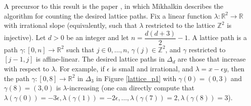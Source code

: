 \documentclass{amsart}
\begin{document}
A precursor to this result is the paper \cite{MikCountingCurvesLatticePaths}, in which Mikhalkin describes the algorithm for counting the desired lattice paths. Fix a linear function $\lambda: \mathbb{R}^2\rightarrow \mathbb{R}$ with irrational slope (equivalently, such that $\lambda$ restricted to the lattice $\mathbb{Z}^2$ is injective). Let $d>0$ be an integer and let $n=\dfrac{d(d+3)}{2}-1$. A lattice path is a path $\gamma: [0,n]\rightarrow \mathbb{R}^2$ such that $j\in 0,\dots, n$, $\gamma(j)\in \mathbb{Z}^2$, and $\gamma$ restricted to $[j-1,j]$ is affine-linear. The desired lattice paths in $\Delta_d$ are those that increase with respect to $\lambda$. For example, if $\epsilon$ is small and irrational, and $\lambda=x-\epsilon y$, then the path $\gamma: [0,8]\rightarrow \mathbb{R}^2$ in $\Delta_3$ in Figure \ref{lattice_p1} with $\gamma(0)=(0,3)$ and $\gamma(8)=(3,0)$ is $\lambda$-increasing (one can directly compute that $\lambda(\gamma(0))=-3\epsilon, \lambda(\gamma(1))=-2\epsilon, \dots, \lambda(\gamma(7))=2, \lambda(\gamma(8))=3$).
\end{document}

